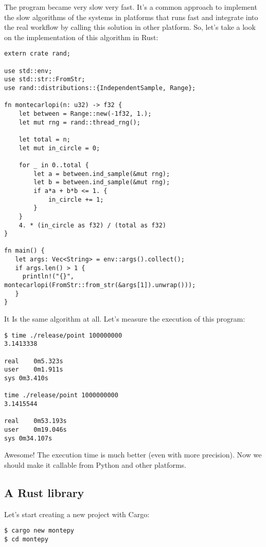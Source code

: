 The program became very slow very fast. It's a common approach to implement the
slow algorithms of the systems in platforms that runs fast and integrate into
the real workflow by calling this solution in other platform. So, let's take a
look on the implementation of this algorithm in Rust:

\begin{lstlisting}[label=rmcalg,caption=Rust Monte Carlo algorithm]
extern crate rand;

use std::env;
use std::str::FromStr;
use rand::distributions::{IndependentSample, Range};

fn montecarlopi(n: u32) -> f32 {
    let between = Range::new(-1f32, 1.);
    let mut rng = rand::thread_rng();

    let total = n;
    let mut in_circle = 0;

    for _ in 0..total {
        let a = between.ind_sample(&mut rng);
        let b = between.ind_sample(&mut rng);
        if a*a + b*b <= 1. {
            in_circle += 1;
        }
    }
    4. * (in_circle as f32) / (total as f32)
}

fn main() {
   let args: Vec<String> = env::args().collect();
   if args.len() > 1 {
     println!("{}", montecarlopi(FromStr::from_str(&args[1]).unwrap()));
   }
}
\end{lstlisting}

It Is the same algorithm at all. Let's measure the execution of this program:

\begin{verbatim}
$ time ./release/point 100000000
3.1413338

real    0m5.323s
user    0m1.911s
sys 0m3.410s

time ./release/point 1000000000
3.1415544

real    0m53.193s
user    0m19.046s
sys 0m34.107s
\end{verbatim}

Awesome! The execution time is much better (even with more precision). Now we
should make it callable from Python and other platforms.

\subsection{A Rust library}

Let's start creating a new project with Cargo:

\begin{verbatim}
$ cargo new montepy
$ cd montepy
\end{verbatim}

